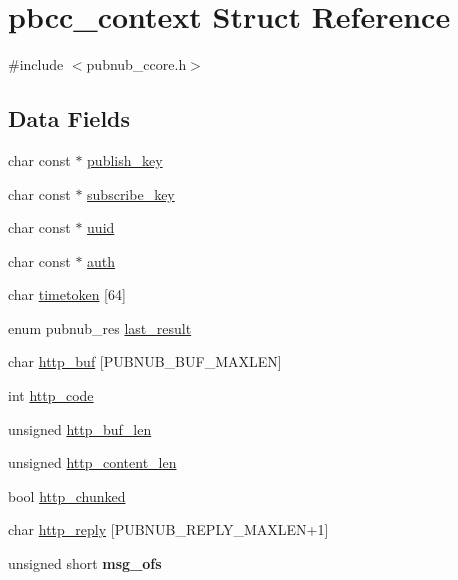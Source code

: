 \hypertarget{structpbcc__context}{\section{pbcc\-\_\-context Struct Reference}
\label{structpbcc__context}
}


{\ttfamily \#include $<$pubnub\-\_\-ccore.\-h$>$}

\subsection*{Data Fields}
\begin{DoxyCompactItemize}
\item 
char const $\ast$ \hyperlink{structpbcc__context_a038ce8bdf5339c5170843c1b470fa3c9}{publish\-\_\-key}
\item 
char const $\ast$ \hyperlink{structpbcc__context_aea41f2045a1dc83f600a2f7bd032a182}{subscribe\-\_\-key}
\item 
char const $\ast$ \hyperlink{structpbcc__context_aa8d0fc21c3ccda3224e890df3a2f7e10}{uuid}
\item 
char const $\ast$ \hyperlink{structpbcc__context_a57d9d0b3237a59baee5b5bfe4ada1e88}{auth}
\item 
char \hyperlink{structpbcc__context_a35c520ac999690a71e134dc56340246c}{timetoken} \mbox{[}64\mbox{]}
\item 
enum pubnub\-\_\-res \hyperlink{structpbcc__context_a0856b6491ba45151606f0aaf3b4682cb}{last\-\_\-result}
\item 
char \hyperlink{structpbcc__context_a74521f09b39cc108dac6cee666119433}{http\-\_\-buf} \mbox{[}P\-U\-B\-N\-U\-B\-\_\-\-B\-U\-F\-\_\-\-M\-A\-X\-L\-E\-N\mbox{]}
\item 
int \hyperlink{structpbcc__context_ad659b41ee54df86b38d74e6f5478c509}{http\-\_\-code}
\item 
unsigned \hyperlink{structpbcc__context_a27c229bf8b80877f536520881466075a}{http\-\_\-buf\-\_\-len}
\item 
unsigned \hyperlink{structpbcc__context_a971e2aac4ff3d79bdf592fb2ef10ff6b}{http\-\_\-content\-\_\-len}
\item 
bool \hyperlink{structpbcc__context_a601d4aa87b762dc9b75c0f534179b9cf}{http\-\_\-chunked}
\item 
char \hyperlink{structpbcc__context_a80e82b122487ea9bb2713e3aee00fcc8}{http\-\_\-reply} \mbox{[}P\-U\-B\-N\-U\-B\-\_\-\-R\-E\-P\-L\-Y\-\_\-\-M\-A\-X\-L\-E\-N+1\mbox{]}
\item 
\hypertarget{structpbcc__context_ac9fd3ea03356b5e8b14779748c1c591c}{unsigned short {\bfseries msg\-\_\-ofs}}\label{structpbcc__context_ac9fd3ea03356b5e8b14779748c1c591c}


\end{DoxyCompactItemize}
